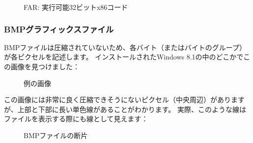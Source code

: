 \begin{figure}[H]
\centering
{}
\caption{FAR: 実行可能32ビットx86コード}
\end{figure}


\clearpage
\subsubsection{BMPグラフィックスファイル}


BMPファイルは圧縮されていないため、各バイト（またはバイトのグループ）が各ピクセルを記述します。
インストールされたWindows 8.1の中のどこかでこの画像を見つけました：

\begin{figure}[H]
\centering
{}
\caption{例の画像}
\end{figure}

この画像には非常に良く圧縮できそうにないピクセル（中央周辺）がありますが、上部と下部に長い単色線があることがわかります。
実際、このような線はファイルを表示する際にも線として見えます：

\begin{figure}[H]
\centering
{}
\caption{BMPファイルの断片}
\end{figure}